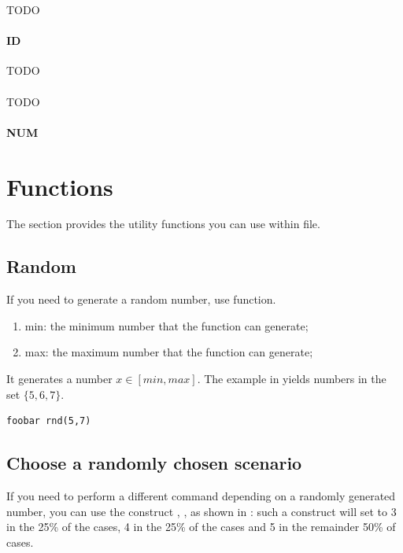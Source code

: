     TODO

    \paragraph{ ID}

    TODO

    \paragraph{}

    TODO

    \paragraph{ NUM}

    \section{Functions}

    The section provides the utility functions you can use within  file.

    \subsection{Random}

    If you need to generate a random number, use  function.
    \begin{enumerate}
        \item min: the minimum number that the function can generate;
        \item max: the maximum number that the function can generate;
    \end{enumerate}
    It generates a number $x \in [min,max]$. The example in  yields numbers in the set $\{5,6,7\}$.

    \begin{lstlisting}[language=rms,label=rms:rnd]
        foobar rnd(5,7)
    \end{lstlisting}

    \subsection{Choose a randomly chosen scenario}

    If you need to perform a different command depending on a randomly generated number, you can use the construct , , as shown in : such a construct will set  to 3 in the 25\% of the cases, 4 in the 25\% of the cases and 5 in the remainder 50\% of cases.

